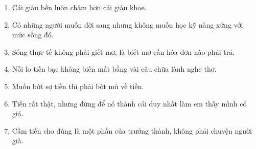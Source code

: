 \begin{enumerate}[leftmargin=*]
\item Cái giàu bền luôn chậm hơn cái giàu khoe.
\item Có những người muốn đời sang nhưng không muốn học kỹ năng xứng với mức sống đó.
\item Sống thực tế không phải giết mơ, là biết mơ cần hóa đơn nào phải trả.
\item Nỗi lo tiền bạc không biến mất bằng vài câu chữa lành nghe thơ.
\item Muốn bớt sợ tiền thì phải bớt mù về tiền.
\item Tiền rất thật, nhưng đừng để nó thành cái duy nhất làm em thấy mình có giá.
\item Cầm tiền cho đúng là một phần của trưởng thành, không phải chuyện người già.
\end{enumerate}

